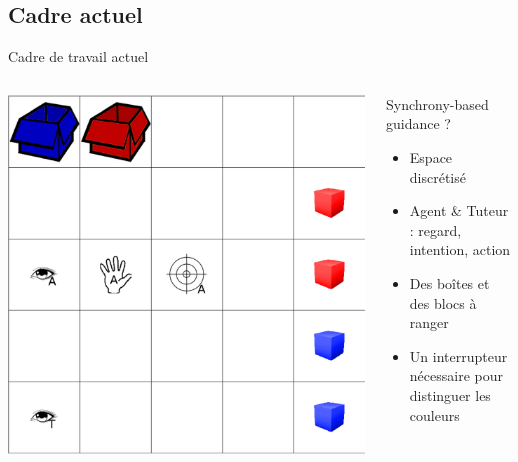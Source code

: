 \documentclass[xcolor=pst,dvips,12pt,english,french]{beamer}
\begin{document}
	\subsection{Cadre actuel}
	
	\begin{frame}{Cadre de travail actuel}
		\begin{columns}
			\begin{column}{0.55\textwidth}
				\includegraphics[width=\textwidth]{images/playroom.eps}
			\end{column}
			\begin{column}{0.45\textwidth}
				\begin{block}{Synchrony-based guidance ?}
					\begin{itemize}
						\item Espace discrétisé
						\item Agent \& Tuteur : regard, intention, action
						\item Des boîtes et des blocs à ranger
						\item Un interrupteur nécessaire pour distinguer les couleurs
					\end{itemize}
				\end{block}
			\end{column}
		\end{columns}
	\end{frame}
\end{document}
